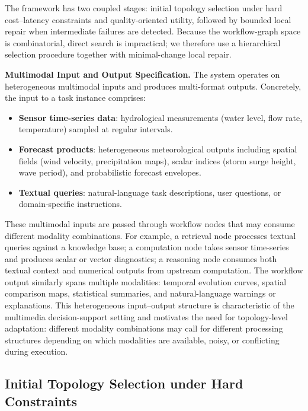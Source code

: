 \documentclass[acmsmall,review,anonymous]{acmart}
\begin{document}
The framework has two coupled stages: initial topology selection under hard cost--latency constraints and quality-oriented utility, followed by bounded local repair when intermediate failures are detected. Because the workflow-graph space is combinatorial, direct search is impractical; we therefore use a hierarchical selection procedure together with minimal-change local repair.

\medskip
\noindent\textbf{Multimodal Input and Output Specification.}
The system operates on heterogeneous multimodal inputs and produces multi-format outputs. Concretely, the input to a task instance comprises:

\begin{itemize}
    \item \textbf{Sensor time-series data}: hydrological measurements (water level, flow rate, temperature) sampled at regular intervals.
    \item \textbf{Forecast products}: heterogeneous meteorological outputs including spatial fields (wind velocity, precipitation maps), scalar indices (storm surge height, wave period), and probabilistic forecast envelopes.
    \item \textbf{Textual queries}: natural-language task descriptions, user questions, or domain-specific instructions.
\end{itemize}

These multimodal inputs are passed through workflow nodes that may consume different modality combinations. For example, a retrieval node processes textual queries against a knowledge base; a computation node takes sensor time-series and produces scalar or vector diagnostics; a reasoning node consumes both textual context and numerical outputs from upstream computation. The workflow output similarly spans multiple modalities: temporal evolution curves, spatial comparison maps, statistical summaries, and natural-language warnings or explanations. This heterogeneous input--output structure is characteristic of the multimedia decision-support setting and motivates the need for topology-level adaptation: different modality combinations may call for different processing structures depending on which modalities are available, noisy, or conflicting during execution.

\subsection{Initial Topology Selection under Hard Constraints}
\label{sec:init_objective}
\end{document}
